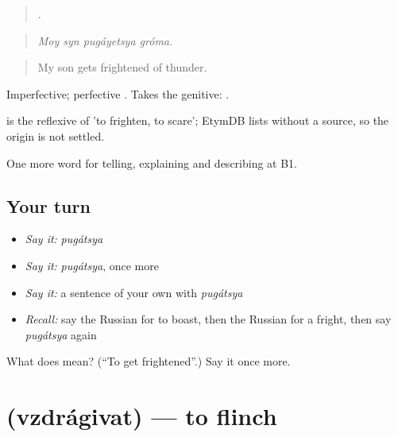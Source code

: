\begin{quote}
   .
\end{quote}

\begin{quote}
\emph{Moy syn pugáyetsya gróma.}
\end{quote}

\begin{quote}
My son gets frightened of thunder.
\end{quote}

Imperfective; perfective . Takes the genitive: \emph{ }.

\begin{cousinweb}
\emph{} is the reflexive of \emph{} 'to frighten, to scare'; EtymDB lists \emph{} without a source, so the origin is not settled.
\end{cousinweb}

\begin{grammarlens}[title={What you've built}]
One more word for telling, explaining and describing at B1.
\end{grammarlens}

\subsection*{Your turn}
\begin{itemize}
\raggedright
  \item \emph{Say it:} \emph{pugátsya}
  \item \emph{Say it:} \emph{pugátsya}, once more
  \item \emph{Say it:} a sentence of your own with \emph{pugátsya}
  \item \emph{Recall:} say the Russian for to boast, then the Russian for a fright, then say \emph{pugátsya} again
\end{itemize}

\begin{tcolorbox}[breakable,colback=teal!4,colframe=teal!35!black,title={Before you move on}]
What does  mean? (\textquotedblleft{}To get frightened\textquotedblright{}.) Say it once more.
\end{tcolorbox}
\section[\texorpdfstring{\ru{вздрагивать} (vzdrágivat)}{вздрагивать (vzdrágivat)}]{ (vzdrágivat) — to flinch}

